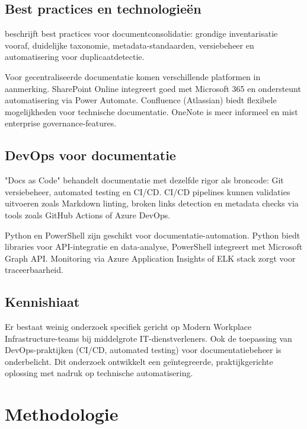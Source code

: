 \subsection{Best practices en technologieën}

\textcite{Walker2007} beschrijft best practices voor document\-consolidatie: grondige inventarisatie vooraf, duidelijke taxonomie, meta\-data-standaarden, versie\-beheer en automatisering voor duplicaat\-detectie.

Voor gecentraliseerde documentatie komen verschillende platformen in aanmerking. Share\-Point Online integreert goed met Microsoft 365 en ondersteunt auto\-matisering via Power Automate. Confluence (Atlassian) biedt flexibele mogelijkheden voor technische documentatie. One\-Note is meer informeel en mist enterprise governance-features.

\subsection{DevOps voor documentatie}

"Docs as Code" behandelt documentatie met dezelfde rigor als broncode: Git versiebeheer, automated testing en CI/CD. CI/CD pipelines kunnen validaties uitvoeren zoals Markdown linting, broken links detection en metadata checks via tools zoals GitHub Actions of Azure DevOps.

Python en Power\-Shell zijn geschikt voor documentatie-automation. Python biedt libraries voor API-inte\-gratie en data-analyse, Power\-Shell integreert met Microsoft Graph API. Monitoring via Azure Application Insights of ELK stack zorgt voor traceer\-baarheid.

\subsection{Kennishiaat}

Er bestaat weinig onderzoek specifiek gericht op Modern Workplace Infrastructure\allowbreak-teams bij middelgrote IT-dienstverleners. Ook de toepassing van DevOps-praktijken (CI/CD, automated testing) voor documentatiebeheer is onderbelicht. Dit onderzoek ontwikkelt een geïntegreerde, praktijkgerichte oplossing met nadruk op technische automatisering.

\section{Methodologie}%
\label{sec:methodologie}

